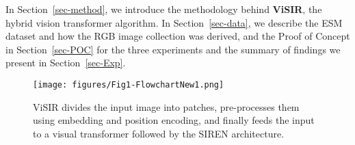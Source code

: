
In Section~\ref{sec-method}, we introduce the methodology behind \textbf{ViSIR}, the hybrid vision transformer algorithm. In Section~\ref{sec-data}, we describe the ESM dataset and how the RGB image collection was derived, and the Proof of Concept in Section~\ref{sec-POC} for the three experiments and the summary of findings we present in Section~\ref{sec-Exp}.

\begin{figure}[!ht]
 \centering
 \texttt{[image: figures/Fig1-FlowchartNew1.png]} 
 \vspace*{-2em}
 \caption{ViSIR divides the input image into patches, pre-processes them using embedding and position encoding, and finally feeds the input to a visual transformer followed by the SIREN architecture.}
 \label{fig-Flowchart}
 \vspace*{-1em}
\end{figure}